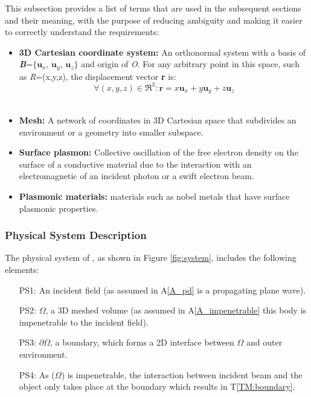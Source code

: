 \documentclass[12pt]{article}
\begin{document}
	
	
	This subsection provides a list of terms that are used in the subsequent
	sections and their meaning, with the purpose of reducing ambiguity and making
	it easier to correctly understand the requirements:
	
	\begin{itemize} \item \textbf{3D Cartesian coordinate system:} An orthonormal
		system with a basis of \textbf{\textit{B}}=$\{$$\textbf{u}_x$, $\textbf{u}_y$,
		$\textbf{u}_z$$\}$ and origin of \textit{O}. For any arbitrary point in this
		space, such as \textit{R}=(x,y,z), the displacement vector \textbf{r} is: \\
		
		\begin{equation} \label{eq:planewave} \forall (x, y, z) \in \Re^3: \textbf{r}=
			x\textbf{u}_x + y\textbf{u}_y +z\textbf{u}_z \end{equation} \\
		
		\item \textbf{Mesh:} A network of coordinates in 3D Cartesian space that
		subdivides an environment or a geometry into smaller subspace. \item
		\textbf{Surface plasmon:} Collective oscillation of the free electron density
		on the surface of a conductive material due to the interaction with an
		electromagnetic of an incident photon or a swift electron beam. \item
		\textbf{Plasmonic materials:} materials such as nobel metals that have surface
		plasmonic properties.
		
		
	\end{itemize}
	
	
	\subsubsection{Physical System Description} \label{sec_phySystDescrip}
	
	
	
	The physical system of \progname{}, as shown in Figure \ref{fig:system},
	includes the following elements:
	
	
	\begin{itemize}
		
		\item[PS1:] An incident field (as assumed in A\ref{A_pd} is a propagating
		plane wave).
		
		\item[PS2:] $\Omega$, a 3D meshed volume (as assumed in A\ref{A_impenetrable}
		this body is impenetrable to the incident field).
		
		\item[PS3:] $\partial\Omega$, a boundary, which forms a 2D interface between
		$\Omega$ and outer environment.
		
		
		\item[PS4:] As ($\Omega$) is impenetrable, the interaction between incident
		beam and the object only takes place at the boundary which results in
		T\ref{TM:boundary}. \end{itemize}
	
\end{document}
